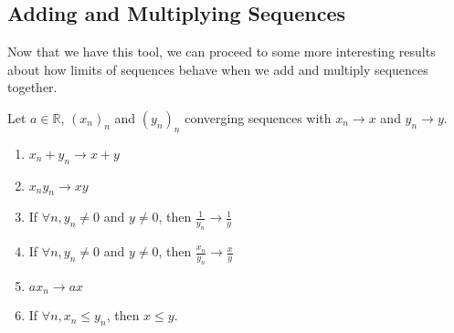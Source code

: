 \documentclass[../real_analysis.tex]{subfiles}
\begin{document}
        \subsection{Adding and Multiplying Sequences}\label{subsec:adding-and-multiplying-sequences}
            Now that we have this tool, we can proceed to some more interesting results about how limits of sequences behave when we add and multiply sequences together.
            \begin{theorem}\label{thm:seq-lim-props}
                Let $a\in\mathbb{R}$, $(x_n)_n$ and $(y_n)_n$ converging sequences with $x_n\to x$ and $y_n\to y$.
                \begin{enumerate}[label={\upshape(\roman*)}]
                    \item $x_n+y_n\to x+y$
                    \item $x_ny_n\to xy$
                    \item If $\forall n, y_n\neq0$ and $y\neq0$, then $\frac{1}{y_n}\to\frac{1}{y}$
                    \item If $\forall n, y_n\neq0$ and $y\neq0$, then $\frac{x_n}{y_n}\to\frac{x}{y}$
                    \item $ax_n\to ax$
                    \item If $\forall n, x_n\leq y_n$, then $x\leq y$.
                \end{enumerate}
            \end{theorem}
\end{document}
